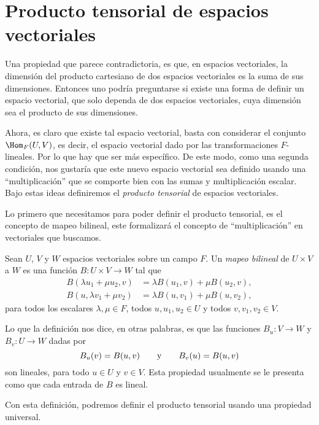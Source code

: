 \section{Producto tensorial de espacios vectoriales}

Una propiedad que parece contradictoria, es que, en espacios vectoriales, la dimensión del producto cartesiano de dos espacios vectoriales es la suma de sus dimensiones. Entonces uno podría preguntarse si existe una forma de definir un espacio vectorial, que solo dependa de dos espacios vectoriales, cuya dimensión sea el producto de sus dimensiones.

Ahora, es claro que existe tal espacio vectorial, basta con considerar el conjunto $\Hom_F(U, V)$, es decir, el espacio vectorial dado por las transformaciones $F$-lineales. Por lo que hay que ser más específico. De este modo, como una segunda condición, nos gustaría que este nuevo espacio vectorial sea definido usando una ``multiplicación'' que se comporte bien con las sumas y multiplicación escalar. Bajo estas ideas definiremos el \emph{producto tensorial} de espacios vectoriales.

Lo primero que necesitamos para poder definir el producto tensorial, es el concepto de mapeo bilineal, este formalizará el concepto de ``multiplicación'' en vectoriales que buscamos.

\begin{definition}
  Sean $U$, $V$ y $W$ espacios vectoriales sobre un campo $F$. Un \emph{mapeo bilineal} de $U \times V$ a $W$ es una función $B\colon U \times V \to W$ tal que
  \begin{align*}
    B(\lambda u_1 + \mu u_2, v) &= \lambda B(u_1, v) + \mu B(u_2, v), \\
    B(u, \lambda v_1 + \mu v_2) &= \lambda B(u, v_1) + \mu B(u, v_2),
  \end{align*}
  para todos los escalares $\lambda, \mu\in F$, todos $u, u_1, u_2 \in U$ y todos $v, v_1, v_2 \in V$.
\end{definition}

Lo que la definición nos dice, en otras palabras, es que las funciones $B_u \colon V \to W$ y $B_v \colon U \to W$ dadas por
  \[
    B_u(v) = B(u,v)
      \qquad\text{y}\qquad
    B_v(u) = B(u, v)
  \]
son lineales, para todo $u \in U$ y $v \in V$. Esta propiedad usualmente se le presenta como que cada entrada de $B$ es lineal.

Con esta definición, podremos definir el producto tensorial usando una propiedad universal.

